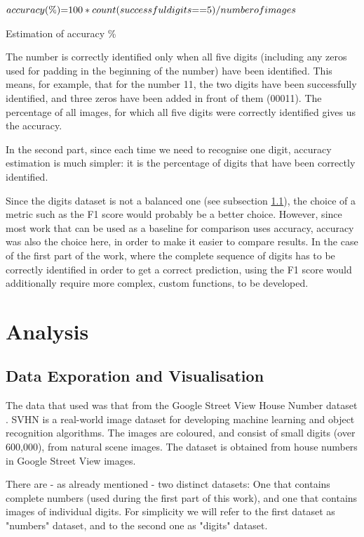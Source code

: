 \documentclass[final,12p,times]{elsarticle}
\begin{document}
\begin{Itemize}
\begin{algorithm}[H]
   \begin{math}accuracy(\%) $=$ 100 * count(successful digits $=$ $=$ 5) / number of images\end{math}
\caption{Estimation of accuracy \%}
\label{alg1}
\end{algorithm}


The number is correctly identified only when all five digits (including any zeros used for padding in the beginning of the 
number) have been identified.
This means, for example, that for the number 11, the two digits have been successfully identified, and three zeros have been 
added in front of them (00011).
The percentage of all images, for which all five digits were correctly identified gives us the accuracy.

In the second part, since each time we need to recognise one digit, accuracy estimation is much simpler:
it is the percentage of digits that have been correctly identified.

Since the digits dataset is not a balanced one (see subsection \ref{sec:4.1}), the choice of a metric such as the F1 score 
would probably be a better choice.
However, since most work that can be used as a baseline for comparison uses accuracy, accuracy was also the choice here, in 
order to make it easier to compare results.
In the case of the first part of the work, where the complete sequence of digits has to be correctly identified in order to 
get a correct prediction, using the F1 score would additionally require more complex, custom functions, to be developed.

\section{Analysis}
\subsection{Data Exporation and Visualisation}
\label{sec:4.1}
The data that used was that from the Google Street View House Number dataset \cite{ 37648}. 
SVHN is a real-world image dataset for developing machine learning and object recognition algorithms. 
The images are coloured, and consist of small digits (over 600,000), from natural scene images. 
The dataset is obtained from house numbers in Google Street View images.

There are - as already mentioned - two distinct datasets:
One that contains complete numbers (used during the first part of this work), and one that contains images of individual digits.
For simplicity we will refer to the first dataset as "numbers" dataset, and to the second one as "digits" dataset.


\end{Itemize}
\end{document}
